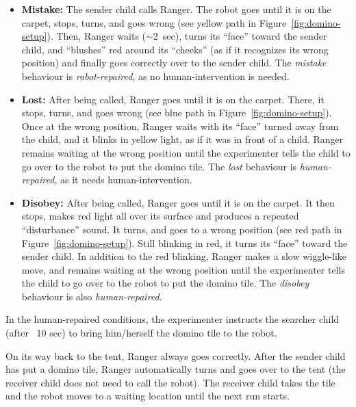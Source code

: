 \documentclass{sig-alternate}
\begin{document}
\begin{itemize}	

    \item \textbf{Mistake:} The sender child calls Ranger. The robot goes until
    it is on the carpet, stops, turns, and goes wrong (see yellow path in
    Figure~\ref{fig:domino-setup}). Then, Ranger waits ($\sim$2~sec), turns its
    ``face'' toward the sender child, and ``blushes'' red around its ``cheeks''
    (as if it recognizes its wrong position) and finally goes correctly over to
    the sender child. The \textit{mistake} behaviour is \textit{robot-repaired},
    as no human-intervention is needed.

    \item \textbf{Lost:} After being called, Ranger goes until it is on the
    carpet. There, it stops, turns, and goes wrong (see blue path in
    Figure~\ref{fig:domino-setup}). Once at the wrong position, Ranger waits
    with its ``face'' turned away from the child, and it blinks in yellow light,
    as if it was in front of a child. Ranger remains waiting at the wrong
    position until the experimenter tells the child to go over to the robot to
    put the domino tile. The \textit{lost} behaviour is \textit{human-repaired},
    as it needs human-intervention.

    \item \textbf{Disobey:} After being called, Ranger goes until it is on the
    carpet. It then stops, makes red
    light all over its surface and produces a repeated ``disturbance'' sound. It
    turns, and goes to a wrong position (see red path in
    Figure~\ref{fig:domino-setup}). Still blinking in red, it turns its ``face''
    toward the sender child. In addition to the red blinking, Ranger
    makes a slow wiggle-like move, and remains waiting at the wrong position
    until the experimenter tells the child to go over to the robot to put the
    domino tile. The \textit{disobey} behaviour is also \textit{human-repaired}.	

\end{itemize}

In the human-repaired conditions, the experimenter instructs the searcher child
(after ~10 sec) to bring him/herself the domino tile to the robot.

On its way back to the tent, Ranger always goes correctly. After the sender
child has put a domino tile, Ranger automatically turns and goes over to the
tent (the receiver child does not need to call the robot). The receiver child
takes the tile and the robot moves to a waiting location until the next run
starts.
\end{document}
